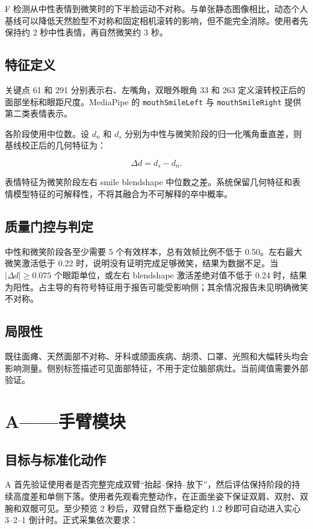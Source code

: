 \documentclass[11pt,a4paper]{article}
\begin{document}
F 检测从中性表情到微笑时的下半脸运动不对称。与单张静态图像相比，动态个人基线可以降低天然脸型不对称和固定相机滚转的影响，但不能完全消除。使用者先保持约 2 秒中性表情，再自然微笑约 3 秒。

\subsection{特征定义}

关键点 61 和 291 分别表示右、左嘴角，双眼外眼角 33 和 263 定义滚转校正后的面部坐标和眼距尺度。MediaPipe 的 \texttt{mouthSmileLeft} 与 \texttt{mouthSmileRight} 提供第二类表情表示。

各阶段使用中位数。设 $d_n$ 和 $d_s$ 分别为中性与微笑阶段的归一化嘴角垂直差，则基线校正后的几何特征为：

\begin{equation}
\Delta d=d_s-d_n.
\end{equation}

表情特征为微笑阶段左右 smile blendshape 中位数之差。系统保留几何特征和表情模型特征的可解释性，不将其融合为不可解释的卒中概率。

\subsection{质量门控与判定}

中性和微笑阶段各至少需要 5 个有效样本，总有效帧比例不低于 0.50。左右最大微笑激活低于 0.22 时，说明没有证明完成足够微笑，结果为数据不足。当 $|\Delta d|\geq0.075$ 个眼距单位，或左右 blendshape 激活差绝对值不低于 0.24 时，结果为阳性。占主导的有符号特征用于报告可能受影响侧；其余情况报告未见明确微笑不对称。

\subsection{局限性}

既往面瘫、天然面部不对称、牙科或颌面疾病、胡须、口罩、光照和大幅转头均会影响测量。侧别标签描述可见面部特征，不用于定位脑部病灶。当前阈值需要外部验证。

\section{A——手臂模块}

\subsection{目标与标准化动作}

A 首先验证使用者是否完整完成双臂“抬起--保持--放下”，然后评估保持阶段的持续高度差和单侧下落。使用者先观看完整动作，在正面坐姿下保证双肩、双肘、双腕和双髋可见。至少预览 2 秒后，双臂自然下垂稳定约 1.2 秒即可自动进入实心 3--2--1 倒计时。正式采集依次要求：
\end{document}
